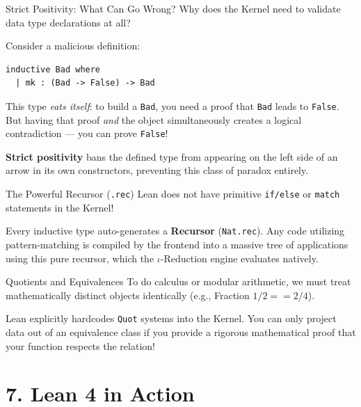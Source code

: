 \documentclass[10pt,aspectratio=169]{beamer}
\begin{document}
\begin{frame}[fragile]{Strict Positivity: What Can Go Wrong?}
    Why does the Kernel need to validate data type declarations at all?
    
    \vspace{0.5em}
    Consider a malicious definition:
    \begin{lstlisting}[language={}]
inductive Bad where
  | mk : (Bad -> False) -> Bad
    \end{lstlisting}
    
    This type \textit{eats itself}: to build a \verb|Bad|, you need a proof that \verb|Bad| leads to \verb|False|. But having that proof \textit{and} the object simultaneously creates a logical contradiction — you can prove \verb|False|!
    
    \vspace{0.5em}
    \textbf{Strict positivity} bans the defined type from appearing on the left side of an arrow in its own constructors, preventing this class of paradox entirely.
\end{frame}

\begin{frame}[fragile]{The Powerful Recursor (\texttt{.rec})}
    Lean does not have primitive \verb|if/else| or \verb|match| statements in the Kernel!
    
    Every inductive type auto-generates a \textbf{Recursor} (\verb|Nat.rec|). Any code utilizing pattern-matching is compiled by the frontend into a massive tree of applications using this pure recursor, which the $\iota$-Reduction engine evaluates natively.
\end{frame}

\begin{frame}[fragile]{Quotients and Equivalences}
    To do calculus or modular arithmetic, we must treat mathematically distinct objects identically (e.g., Fraction $1/2 == 2/4$).
    
    Lean explicitly hardcodes \verb|Quot| systems into the Kernel. You can only project data out of an equivalence class if you provide a rigorous mathematical proof that your function respects the relation!
\end{frame}

\section{7. Lean 4 in Action}
\end{document}
